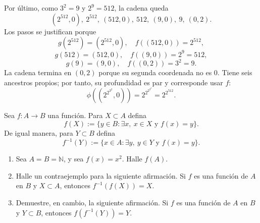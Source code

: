 \documentclass[11pt]{article}
\newcommand{\N}{\mathbb{N}}
\begin{document}
\begin{solution}
Por último, como $3^2=9$ y $2^9=512$, la cadena queda
\[
(2^{512},0),\ 2^{512},\ (512,0),\ 512,\ (9,0),\ 9,\ (0,2).
\]
Los pasos se justifican porque
\[
g(2^{512})=(2^{512},0),\quad f((512,0))=2^{512},
\]
\[
g(512)=(512,0),\quad f((9,0))=2^9=512,
\]
\[
g(9)=(9,0),\quad f((0,2))=3^2=9.
\]
La cadena termina en $(0,2)$ porque su segunda coordenada no es $0$. Tiene seis
ancestros propios; por tanto, su profundidad es par y corresponde usar $f$:
\[
\boxed{
\phi\!\left(\left(2^{2^{3^2}},0\right)\right)
=2^{2^{2^{3^2}}}=2^{2^{512}}}.
\]
\end{solution}

\begin{question}
Sea $f:A\to B$ una función. Para $X\subset A$ defina
\[
f(X):=\{y\in B:\exists x,\ x\in X\text{ y }f(x)=y\}.
\]
De igual manera, para $Y\subset B$ defina
\[
f^{-1}(Y):=\{x\in A:\exists y,\ y\in Y\text{ y }f(x)=y\}.
\]

\begin{enumerate}
  \item[(a)] Sea $A=B=\N$, y sea $f(x)=x^2$. Halle $f(A)$.
  \item[(b)] Halle un contraejemplo para la siguiente afirmación. Si $f$ es una función de $A$ en $B$ y $X\subset A$, entonces $f^{-1}(f(X))=X$.
  \item[(c)] Demuestre, en cambio, la siguiente afirmación. Si $f$ es una función de $A$ en $B$ y $Y\subset B$, entonces $f(f^{-1}(Y))=Y$.
\end{enumerate}
\end{question}
\end{document}
